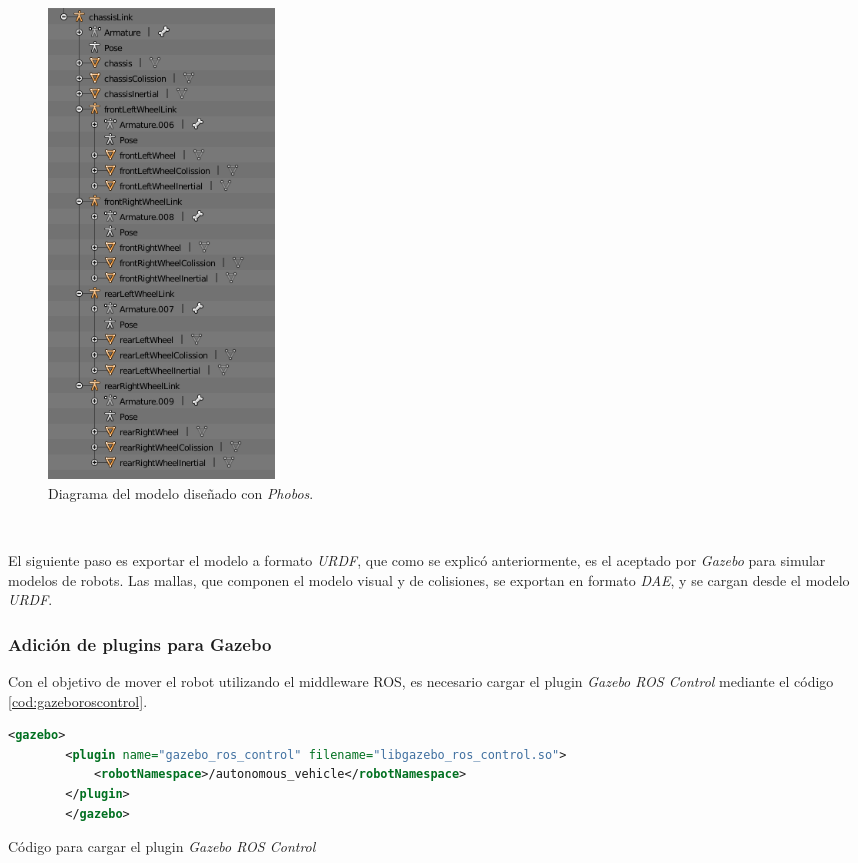 \begin{figure} [h!]
	\begin{center}
		\includegraphics[width=6cm]{figs/phobosDiagram}
	\end{center}
	\caption{Diagrama del modelo diseñado con \textit{Phobos}.}
	\label{fig:blenderdiagram}
\end{figure}\

El siguiente paso es exportar el modelo a formato \textit{URDF}, que como se explicó anteriormente, es el aceptado por \textit{Gazebo} para simular modelos de robots. Las mallas, que componen el modelo visual y de colisiones, se exportan en formato \textit{DAE}, y se cargan desde el modelo \textit{URDF}.\\


\subsubsection{Adición de plugins para Gazebo}

Con el objetivo de mover el robot utilizando el middleware ROS, es necesario cargar el plugin \textit{Gazebo ROS Control} mediante el código \ref{cod:gazeboroscontrol}.\\

\begin{code}[h]
	\begin{lstlisting}[language=XML]
		<gazebo>
		<plugin name="gazebo_ros_control" filename="libgazebo_ros_control.so">
			<robotNamespace>/autonomous_vehicle</robotNamespace>
		</plugin>
		</gazebo>
	\end{lstlisting}
	\caption[Código para cargar el plugin \textit{Gazebo ROS Control}]{Código para cargar el plugin \textit{Gazebo ROS Control}}
	\label{cod:gazeboroscontrol}
\end{code}

